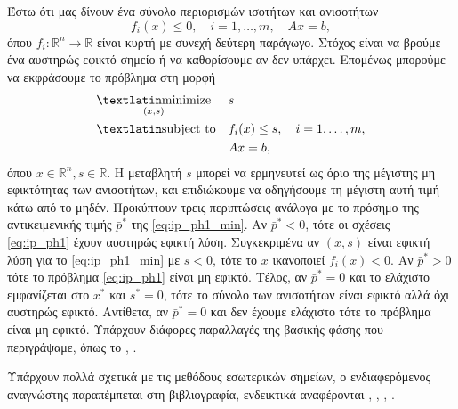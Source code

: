Έστω ότι μας δίνουν ένα σύνολο περιορισμών ισοτήτων και ανισοτήτων
\begin{equation}\label{eq:ip_ph1}
    f_i(x) \leq 0, \quad i = 1, \dots,m, \quad Ax = b,
\end{equation}
όπου \( f_i : \mathbb{R}^n \to \mathbb{R} \) είναι κυρτή με συνεχή δεύτερη
παράγωγο. Στόχος είναι να βρούμε ένα αυστηρώς εφικτό σημείο ή να καθορίσουμε
αν δεν υπάρχει. Επομένως μπορούμε να εκφράσουμε το πρόβλημα στη μορφή
\begin{equation}\label{eq:ip_ph1_min}
    \begin{aligned}
        &\underset{(x,s)}{\text{\tl{minimize}}}
        & & s \\
        & \text{\tl{subject to}}
        & & f_i(x) \leq s, \quad i = 1,\dots,m, \\
        &&& Ax = b,
    \end{aligned}
\end{equation}
όπου \( x \in \mathbb{R}^n, s \in \mathbb{R} \). Η μεταβλητή \( s \) μπορεί να
ερμηνευτεί ως όριο της μέγιστης μη εφικτότητας των ανισοτήτων, και επιδιώκουμε
να οδηγήσουμε τη μέγιστη αυτή τιμή κάτω από το μηδέν. Προκύπτουν τρεις
περιπτώσεις ανάλογα με το πρόσημο της αντικειμενικής τιμής \( \bar{p}^*\) της
\eqref{eq:ip_ph1_min}. Αν \(\bar{p}^* < 0 \), τότε οι σχέσεις \eqref{eq:ip_ph1}
έχουν αυστηρώς εφικτή λύση. Συγκεκριμένα αν \((x,s)\) είναι εφικτή λύση για το
\eqref{eq:ip_ph1_min} με \(s<0\), τότε το \(x\) ικανοποιεί \(f_i(x)<0\). Αν
\(\bar{p}^*>0\) τότε το πρόβλημα \eqref{eq:ip_ph1} είναι μη εφικτό. Τέλος, αν
\(\bar{p}^*=0\) και το ελάχιστο εμφανίζεται στο \( x^*\) και \(s^*=0\), τότε το
σύνολο των ανισοτήτων είναι εφικτό αλλά όχι αυστηρώς εφικτό. Αντίθετα, αν
\(\bar{p}^*=0\) και δεν έχουμε ελάχιστο τότε το πρόβλημα είναι μη εφικτό.
Υπάρχουν διάφορες παραλλαγές της βασικής φάσης  που περιγράψαμε, όπως το
, .

Υπάρχουν πολλά σχετικά με τις μεθόδους εσωτερικών σημείων, ο ενδιαφερόμενος
αναγνώστης παραπέμπεται στη βιβλιογραφία, ενδεικτικά αναφέρονται
\cite{renegar2001mathematical}, \cite{nesterov1994interior},
\cite{wright1997primal}, \cite{boyd2004convex}.
